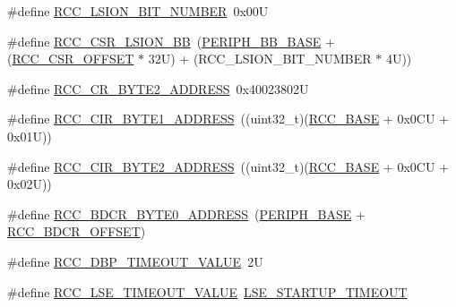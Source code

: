 \begin{DoxyCompactItemize}
\item 
\#define \hyperlink{group___r_c_c___bit_address___alias_region_ga577ffeb20561aa8395fe5327807b5709}{R\+C\+C\+\_\+\+L\+S\+I\+O\+N\+\_\+\+B\+I\+T\+\_\+\+N\+U\+M\+B\+ER}~0x00U
\item 
\#define \hyperlink{group___r_c_c___bit_address___alias_region_gac34a2d63deae3efc65e66f8fb3c26dae}{R\+C\+C\+\_\+\+C\+S\+R\+\_\+\+L\+S\+I\+O\+N\+\_\+\+BB}~(\hyperlink{group___peripheral__memory__map_gaed7efc100877000845c236ccdc9e144a}{P\+E\+R\+I\+P\+H\+\_\+\+B\+B\+\_\+\+B\+A\+SE} + (\hyperlink{group___r_c_c___bit_address___alias_region_ga63141585a221eed1fd009eb80e406619}{R\+C\+C\+\_\+\+C\+S\+R\+\_\+\+O\+F\+F\+S\+ET} $\ast$ 32\+U) + (\+R\+C\+C\+\_\+\+L\+S\+I\+O\+N\+\_\+\+B\+I\+T\+\_\+\+N\+U\+M\+B\+E\+R $\ast$ 4\+U))
\item 
\#define \hyperlink{group___r_c_c___bit_address___alias_region_ga1da336203f39dd57462e7f331271f699}{R\+C\+C\+\_\+\+C\+R\+\_\+\+B\+Y\+T\+E2\+\_\+\+A\+D\+D\+R\+E\+SS}~0x40023802U
\item 
\#define \hyperlink{group___r_c_c___bit_address___alias_region_ga97f80d22ba3506a43accbeb9ceb31f51}{R\+C\+C\+\_\+\+C\+I\+R\+\_\+\+B\+Y\+T\+E1\+\_\+\+A\+D\+D\+R\+E\+SS}~((uint32\+\_\+t)(\hyperlink{group___peripheral__memory__map_ga0e681b03f364532055d88f63fec0d99d}{R\+C\+C\+\_\+\+B\+A\+SE} + 0x0\+C\+U + 0x01\+U))
\item 
\#define \hyperlink{group___r_c_c___bit_address___alias_region_ga1387fb2dfadb830eb83ab2772c8d2294}{R\+C\+C\+\_\+\+C\+I\+R\+\_\+\+B\+Y\+T\+E2\+\_\+\+A\+D\+D\+R\+E\+SS}~((uint32\+\_\+t)(\hyperlink{group___peripheral__memory__map_ga0e681b03f364532055d88f63fec0d99d}{R\+C\+C\+\_\+\+B\+A\+SE} + 0x0\+C\+U + 0x02\+U))
\item 
\#define \hyperlink{group___r_c_c___bit_address___alias_region_ga12a7b221df58454d4c59e1d3109b72f2}{R\+C\+C\+\_\+\+B\+D\+C\+R\+\_\+\+B\+Y\+T\+E0\+\_\+\+A\+D\+D\+R\+E\+SS}~(\hyperlink{group___peripheral__memory__map_ga9171f49478fa86d932f89e78e73b88b0}{P\+E\+R\+I\+P\+H\+\_\+\+B\+A\+SE} + \hyperlink{group___r_c_c___bit_address___alias_region_gaf234fe5d9628a3f0769721e76f83c566}{R\+C\+C\+\_\+\+B\+D\+C\+R\+\_\+\+O\+F\+F\+S\+ET})
\item 
\#define \hyperlink{group___r_c_c___bit_address___alias_region_gae578b5efd6bd38193ab426ce65cb77b1}{R\+C\+C\+\_\+\+D\+B\+P\+\_\+\+T\+I\+M\+E\+O\+U\+T\+\_\+\+V\+A\+L\+UE}~2U
\item 
\#define \hyperlink{group___r_c_c___bit_address___alias_region_gafe8ed1c0ca0e1c17ea69e09391498cc7}{R\+C\+C\+\_\+\+L\+S\+E\+\_\+\+T\+I\+M\+E\+O\+U\+T\+\_\+\+V\+A\+L\+UE}~\hyperlink{stm32f4xx__hal__conf_8h_a85e6fc812dc26f7161a04be2568a5462}{L\+S\+E\+\_\+\+S\+T\+A\+R\+T\+U\+P\+\_\+\+T\+I\+M\+E\+O\+UT}

\end{DoxyCompactItemize}

